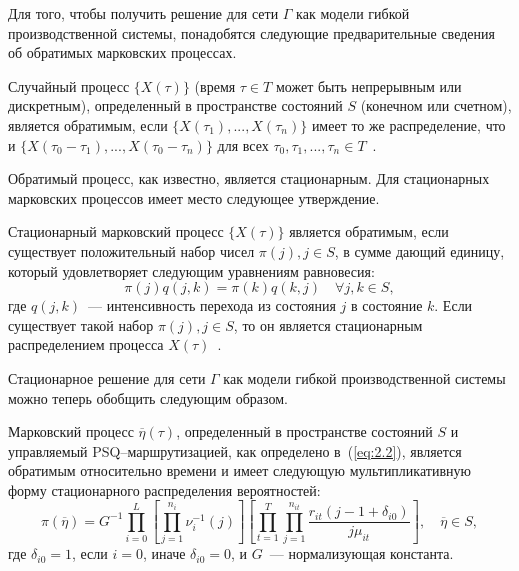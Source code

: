 Для того, чтобы получить решение для сети $\Gamma$ как модели гибкой производственной системы, понадобятся следующие предварительные сведения об обратимых марковских процессах.

\begin{definition}
 Случайный процесс $\{ X(\tau) \}$ (время $\tau \in T$ может быть непрерывным или дискретным), определенный в пространстве состояний $S$ (конечном или счетном), является обратимым, если $\{ X(\tau_1),...,X(\tau_n) \}$ имеет то же распределение, что и $\{ X(\tau_0 - \tau_1),...,X(\tau_0 - \tau_n) \}$ для всех $\tau_0, \tau_1,..., \tau_n \in T$~\cite{kelly}.
\end{definition}

Обратимый процесс, как известно, является стационарным. Для стационарных марковских процессов имеет место следующее утверждение.

\begin{lemma}
 Стационарный марковский процесс $\{ X(\tau) \}$ является обратимым, если существует положительный набор чисел $\pi(j), j \in S$, в сумме дающий единицу, который удовлетворяет следующим уравнениям равновесия:
 \begin{equation}
  \pi(j) q(j,k) = \pi(k) q(k,j) \quad \forall j,k \in S ,
  \label{eq:2.3}
 \end{equation}
 где $q(j,k)$~--- интенсивность перехода из состояния $j$ в состояние $k$. Если существует такой набор $\pi(j), j \in S$, то он является стационарным распределением процесса $X(\tau)$~\cite{kelly}.
\end{lemma}

Стационарное решение для сети $\Gamma$ как модели гибкой производственной системы можно теперь обобщить следующим образом.

\begin{theorem}
 Марковский процесс $\overline{\eta}(\tau)$, определенный в пространстве состояний $S$ и управляемый PSQ--маршрутизацией, как определено в~(\ref{eq:2.2}), является обратимым относительно времени и имеет следующую мультипликативную форму стационарного распределения вероятностей:
 \begin{equation}
  \pi(\overline{\eta}) = G^{-1} \prod_{i=0}^L \left[ \prod_{j=1}^{n_i} \nu_i^{-1} (j) \right]
  \left[ \prod_{t=1}^T \prod_{j=1}^{n_{it}} \frac{r_{it} (j - 1 + \delta_{i0})}{j\mu_{it}} \right], \quad \overline{\eta} \in S ,
  \label{eq:2.4}
 \end{equation}
где $\delta_{i0}=1$, если $i=0$, иначе $\delta_{i0}=0$, и $G$~--- нормализующая константа.
\end{theorem}

